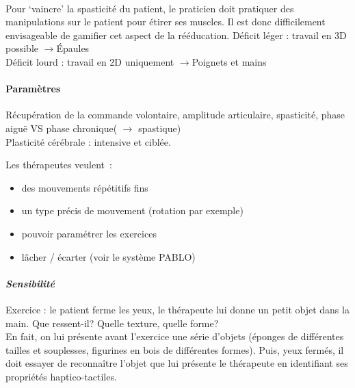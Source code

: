 \paragraph{}
Pour ‘vaincre’ la spasticité du patient, le praticien doit pratiquer des manipulations sur le patient pour étirer ses muscles. Il est donc difficilement envisageable de gamifier cet aspect de la rééducation.\newline
Déficit léger : travail en 3D possible     \quad$ \rightarrow $\quad       Épaules\\
Déficit lourd : travail en 2D uniquement  \quad $\rightarrow $\quad      Poignets et mains

	\paragraph{Paramètres\\}
Récupération de la commande volontaire, amplitude articulaire, spasticité, phase aiguë VS phase chronique( $ \rightarrow $ spastique)\\
Plasticité cérébrale : intensive et ciblée. \newline

Les thérapeutes veulent~: 
\begin{itemize}
	\item des mouvements répétitifs fins
	\item un type précis de mouvement (rotation par exemple)
	\item pouvoir paramétrer les exercices
	\item lâcher / écarter (voir le système PABLO)
\end{itemize}

	\paragraph{\emph{Sensibilité} \\ \quad}
Exercice : le patient ferme les yeux, le thérapeute lui donne un petit objet dans la main. Que ressent-il? Quelle texture, quelle forme? \\
En fait, on lui présente avant l’exercice une série d’objets (éponges de différentes tailles et souplesses, figurines en bois de différentes formes). Puis, yeux fermés, il doit essayer de reconnaître l’objet que lui présente le thérapeute en identifiant ses propriétés haptico-tactiles.
